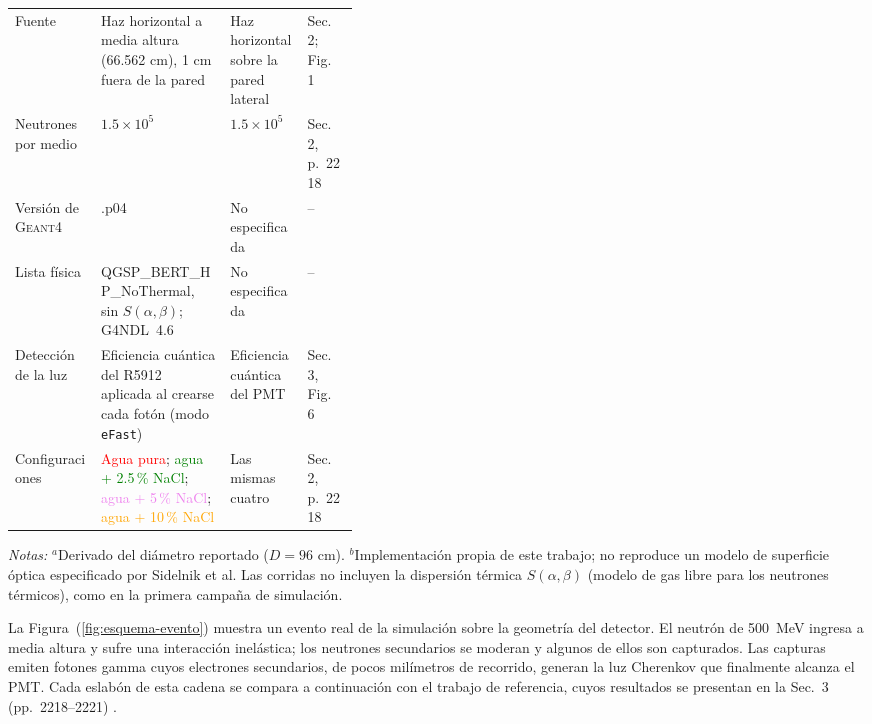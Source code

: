 \begin{table}[!tp]
\begin{tabularx}{\linewidth}{>{\raggedright\arraybackslash}p{0.25\linewidth} >{\raggedright\arraybackslash}X >{\raggedright\arraybackslash}X >{\raggedright\arraybackslash}p{0.15\linewidth}}
		Fuente & Haz horizontal a media altura (66.562 cm), 1 cm fuera de la pared & Haz horizontal sobre la pared lateral & Sec.~2; Fig.~1 \\
		Neutrones por medio & $1.5\times10^{5}$ & $1.5\times10^{5}$ & Sec.~2, p.~2218 \\
		Versión de \textsc{Geant4} & 10.7.p04 & No especificada & -- \\
		Lista física & QGSP\_BERT\_HP\_\allowbreak NoThermal, sin $S(\alpha,\beta)$; G4NDL~4.6 & No especificada & -- \\
		Detección de la luz & Eficiencia cuántica del R5912 aplicada al crearse cada fotón (modo \texttt{eFast}) & Eficiencia cuántica del PMT & Sec.~3, Fig.~6 \\
		\grupo{Medio detector}
		Configuraciones & \textcolor{red}{Agua pura}; \textcolor{green}{agua + 2.5\,\% NaCl}; \textcolor{violet}{agua + 5\,\% NaCl}; \textcolor{orange}{agua + 10\,\% NaCl} & Las mismas cuatro & Sec.~2, p.~2218 \\
		\bottomrule
	\end{tabularx}
	\vspace{0.1cm}
	\begin{minipage}{\linewidth}
		\footnotesize \textit{Notas:} $^{a}$Derivado del diámetro reportado ($D=96$ cm). $^{b}$Implementación propia de este trabajo; no reproduce un modelo de superficie óptica especificado por Sidelnik et al. Las corridas no incluyen la dispersión térmica $S(\alpha,\beta)$ (modelo de gas libre para los neutrones térmicos), como en la primera campaña de simulación.
	\end{minipage}
\end{table}

La Figura~(\ref{fig:esquema-evento}) muestra un evento real de la simulación sobre la geometría del detector. El neutrón de 500~MeV ingresa a media altura y sufre una interacción inelástica; los neutrones secundarios se moderan y algunos de ellos son capturados. Las capturas emiten fotones gamma cuyos electrones secundarios, de pocos milímetros de recorrido, generan la luz Cherenkov que finalmente alcanza el PMT. Cada eslabón de esta cadena se compara a continuación con el trabajo de referencia, cuyos resultados se presentan en la Sec.~3 (pp.~2218--2221) \citep[Sec.~3, pp.~2218--2221]{Sidelnik2020}.

